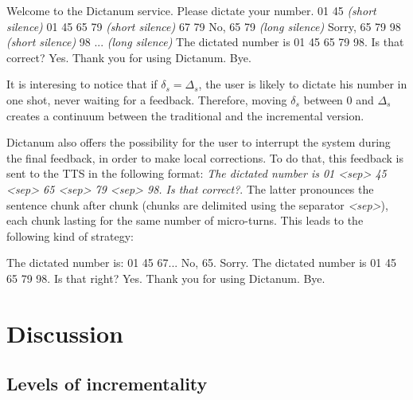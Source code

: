         \begin{dialogue}
       	     Welcome to the Dictanum service. Please dictate your number.
             01 45 \textit{(short silence)}
             01 45
             65 79 \textit{(short silence)}
             67 79
             No, 65 79 \textit{(long silence)}
             Sorry, 65 79
             98 \textit{(short silence)}
             98
             ... \textit{(long silence)}
             The dictated number is 01 45 65 79 98. Is that correct?
             Yes.
             Thank you for using Dictanum. Bye.
        \end{dialogue}

        It is interesing to notice that if $\delta_s = \Delta_s$, the user is likely to dictate his number in one shot, never waiting for a feedback. Therefore, moving $\delta_s$ between 0 and $\Delta_s$ creates a continuum between the traditional and the incremental version.
        
        Dictanum also offers the possibility for the user to interrupt the system during the final feedback, in order to make local corrections. To do that, this feedback is sent to the TTS in the following format: \textit{The dictated number is 01 <sep> 45 <sep> 65 <sep> 79 <sep> 98. Is that correct?}. The latter pronounces the sentence chunk after chunk (chunks are delimited using the separator \textit{<sep>}), each chunk lasting for the same number of micro-turns. This leads to the following kind of strategy:
        
        \begin{dialogue}
             The dictated number is: 01 45 67...
             No, 65.
             Sorry. The dictated number is 01 45 65 79 98. Is that right?
             Yes.
             Thank you for using Dictanum. Bye.
        \end{dialogue}
    
\section{Discussion}

	\subsection{Levels of incrementality}
    
